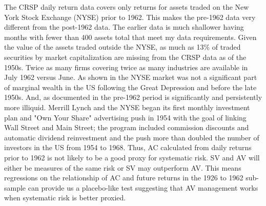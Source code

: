 
The CRSP daily return data covers only returns for assets traded on the New York Stock Exchange (NYSE) prior to 1962. This makes the pre-1962 data very different from the post-1962 data. The earlier data is much shallower having months with fewer than 400 assets total that meet my data requirements. Given the value of the assets traded outside the NYSE, as much as 13\% of traded securities by market capitalization are missing from the CRSP data as of the 1950s. \citep{nyse_history,staff_american_2003} Twice as many firms covering twice as many industries are available in July 1962 versus June. As shown in \citet{taylor_2014} the NYSE market was not a significant part of marginal wealth in the US following the Great Depression and before the late 1950s. And, as documented in \citet{jones_century_2002} the pre-1962 period is significantly and persistently more illiquid. Merrill Lynch and the NYSE began its first monthly investment plan and "Own Your Share" advertising push in 1954 with the goal of linking Wall Street and Main Street; the program included commission discounts and automatic dividend reinvestment and the push more than doubled the number of investors in the US from 1954 to 1968. \citep{noauthor_investment_1964,traflet_own_2003}  Thus, AC calculated from daily returns prior to 1962 is not likely to be a good proxy for systematic risk. SV and AV will either be measures of the same risk or SV may outperform AV. This means regressions on the relationship of AC and future returns in the 1926 to 1962 sub-sample can provide us a placebo-like test suggesting that AV management works when systematic risk is better proxied.

